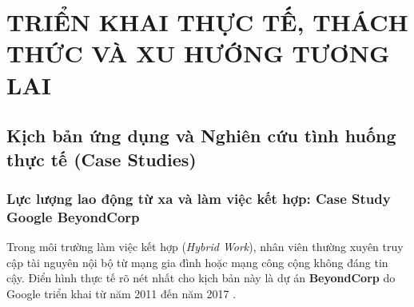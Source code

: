 
\chapter{TRIỂN KHAI THỰC TẾ, THÁCH THỨC VÀ XU HƯỚNG TƯƠNG LAI}
\label{chap:chuong_5}
\section{Kịch bản ứng dụng và Nghiên cứu tình huống thực tế (Case Studies)}
\label{sec:5_1}

\subsection{Lực lượng lao động từ xa và làm việc kết hợp: Case Study Google BeyondCorp}
\label{subsec:5_1_1}

Trong môi trường làm việc kết hợp (\textit{Hybrid Work}), nhân viên thường xuyên truy cập tài nguyên nội bộ từ mạng gia đình hoặc mạng công cộng không đáng tin cậy. Điển hình thực tế rõ nét nhất cho kịch bản này là dự án \textbf{BeyondCorp} do Google triển khai từ năm 2011 đến năm 2017 \cite{ward2014}.

